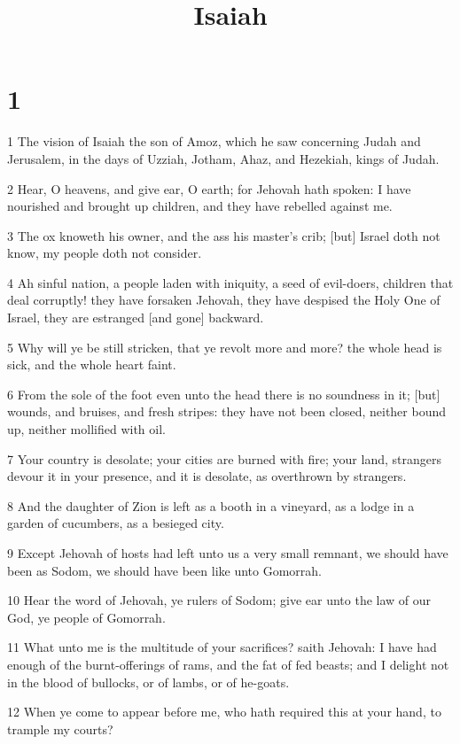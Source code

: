 

\title{Isaiah}

\chapter{1}

\par 1 The vision of Isaiah the son of Amoz, which he saw concerning Judah and Jerusalem, in the days of Uzziah, Jotham, Ahaz, and Hezekiah, kings of Judah.
\par 2 Hear, O heavens, and give ear, O earth; for Jehovah hath spoken: I have nourished and brought up children, and they have rebelled against me.
\par 3 The ox knoweth his owner, and the ass his master's crib; [but] Israel doth not know, my people doth not consider.
\par 4 Ah sinful nation, a people laden with iniquity, a seed of evil-doers, children that deal corruptly! they have forsaken Jehovah, they have despised the Holy One of Israel, they are estranged [and gone] backward.
\par 5 Why will ye be still stricken, that ye revolt more and more? the whole head is sick, and the whole heart faint.
\par 6 From the sole of the foot even unto the head there is no soundness in it; [but] wounds, and bruises, and fresh stripes: they have not been closed, neither bound up, neither mollified with oil.
\par 7 Your country is desolate; your cities are burned with fire; your land, strangers devour it in your presence, and it is desolate, as overthrown by strangers.
\par 8 And the daughter of Zion is left as a booth in a vineyard, as a lodge in a garden of cucumbers, as a besieged city.
\par 9 Except Jehovah of hosts had left unto us a very small remnant, we should have been as Sodom, we should have been like unto Gomorrah.
\par 10 Hear the word of Jehovah, ye rulers of Sodom; give ear unto the law of our God, ye people of Gomorrah.
\par 11 What unto me is the multitude of your sacrifices? saith Jehovah: I have had enough of the burnt-offerings of rams, and the fat of fed beasts; and I delight not in the blood of bullocks, or of lambs, or of he-goats.
\par 12 When ye come to appear before me, who hath required this at your hand, to trample my courts?
